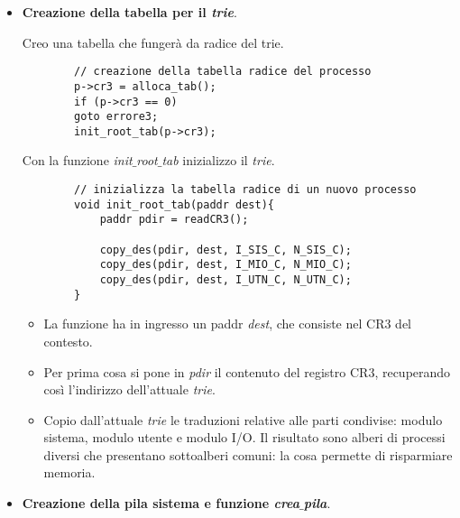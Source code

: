 \begin{itemize}
	\item \textbf{Creazione della tabella per il \emph{trie}}.
	
	Creo una tabella che fungerà da radice del trie. 
	\begin{verbatim}
		// creazione della tabella radice del processo
		p->cr3 = alloca_tab();
		if (p->cr3 == 0)
		goto errore3;
		init_root_tab(p->cr3);
	\end{verbatim}
	Con la funzione \emph{init$\_$root$\_$tab} inizializzo il \emph{trie}. 
	\small
	\begin{verbatim}
		// inizializza la tabella radice di un nuovo processo
		void init_root_tab(paddr dest){
			paddr pdir = readCR3();
			
			copy_des(pdir, dest, I_SIS_C, N_SIS_C);
			copy_des(pdir, dest, I_MIO_C, N_MIO_C);
			copy_des(pdir, dest, I_UTN_C, N_UTN_C);
		}
	\end{verbatim}
	\normalsize
	\begin{itemize}
		\item La funzione ha in ingresso un paddr \emph{dest}, che consiste nel CR3 del contesto.
		\item Per prima cosa si pone in \emph{pdir} il contenuto del registro CR3, recuperando così l'indirizzo dell'attuale \emph{trie}.
		\item Copio dall'attuale \emph{trie} le traduzioni relative alle parti condivise: modulo sistema, modulo utente e modulo I/O. Il risultato sono alberi di processi diversi che presentano sottoalberi comuni: la cosa permette di risparmiare memoria.
	\end{itemize}
	\item \textbf{Creazione della pila sistema e funzione \emph{crea$\_$pila}}.
	

\end{itemize}
